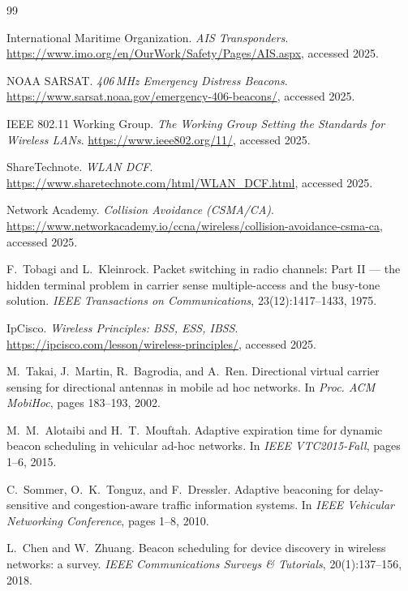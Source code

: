\documentclass[12pt,a4paper,oneside]{report}
\begin{document}
\begin{thebibliography}{99}

 International Maritime Organization. \emph{AIS Transponders}.
\url{https://www.imo.org/en/OurWork/Safety/Pages/AIS.aspx}, accessed 2025.

 NOAA SARSAT. \emph{406\,MHz Emergency Distress Beacons}.
\url{https://www.sarsat.noaa.gov/emergency-406-beacons/}, accessed 2025.

 IEEE 802.11 Working Group. \emph{The Working Group Setting
the Standards for Wireless LANs}. \url{https://www.ieee802.org/11/}, accessed 2025.

 ShareTechnote. \emph{WLAN DCF}.
\url{https://www.sharetechnote.com/html/WLAN_DCF.html}, accessed 2025.

 Network Academy. \emph{Collision Avoidance (CSMA/CA)}.
\url{https://www.networkacademy.io/ccna/wireless/collision-avoidance-csma-ca},
accessed 2025.

 F.~Tobagi and L.~Kleinrock. Packet switching in radio
channels: Part II --- the hidden terminal problem in carrier sense
multiple-access and the busy-tone solution. \emph{IEEE Transactions on
Communications}, 23(12):1417--1433, 1975.

 IpCisco. \emph{Wireless Principles: BSS, ESS, IBSS}.
\url{https://ipcisco.com/lesson/wireless-principles/}, accessed 2025.

 M.~Takai, J.~Martin, R.~Bagrodia, and A.~Ren. Directional
virtual carrier sensing for directional antennas in mobile ad hoc networks. In
\emph{Proc. ACM MobiHoc}, pages 183--193, 2002.

 M.~M.~Alotaibi and H.~T.~Mouftah. Adaptive
expiration time for dynamic beacon scheduling in vehicular ad-hoc networks. In
\emph{IEEE VTC2015-Fall}, pages 1--6, 2015.

 C.~Sommer, O.~K.~Tonguz, and F.~Dressler. Adaptive
beaconing for delay-sensitive and congestion-aware traffic information systems.
In \emph{IEEE Vehicular Networking Conference}, pages 1--8, 2010.

 L.~Chen and W.~Zhuang. Beacon scheduling for device
discovery in wireless networks: a survey. \emph{IEEE Communications Surveys \&
Tutorials}, 20(1):137--156, 2018.


\end{thebibliography}
\end{document}
